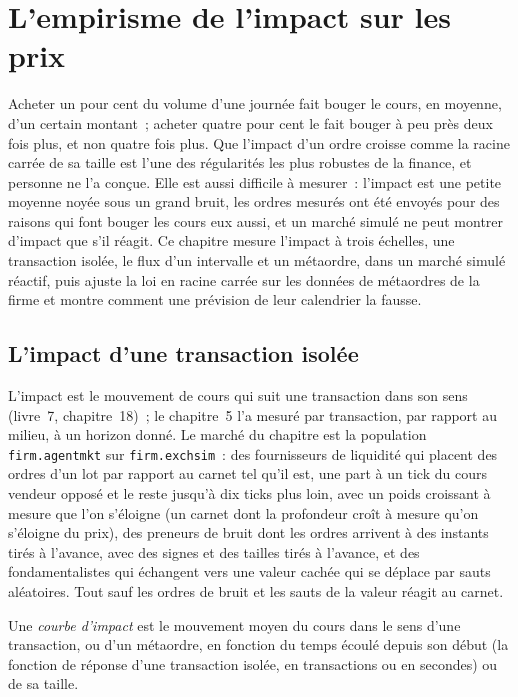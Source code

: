 \chapter{L'empirisme de l'impact sur les prix}\label{ch:mx:the-empirics-of-price-impact}

Acheter un pour cent du volume d'une journée fait bouger le cours, en moyenne, d'un certain montant~; acheter quatre pour cent le fait bouger à peu près deux fois plus, et non quatre fois plus.
Que l'impact d'un ordre croisse comme la racine carrée de sa taille est l'une des régularités les plus robustes de la finance, et personne ne l'a conçue. Elle est aussi
difficile à mesurer~: l'impact est une petite moyenne noyée sous un grand bruit, les ordres mesurés ont été envoyés pour des raisons qui font bouger les cours eux aussi, et un
marché simulé ne peut montrer d'impact que s'il réagit. Ce chapitre mesure l'impact à trois échelles, une transaction isolée, le flux d'un intervalle et un métaordre, dans
un marché simulé réactif, puis ajuste la loi en racine carrée sur les données de métaordres de la firme et montre comment une prévision de leur calendrier la fausse.

\section{L'impact d'une transaction isolée}

L'impact est le mouvement de cours qui suit une transaction dans son sens (livre~7, chapitre~18)~; le chapitre~5 l'a mesuré par transaction, par rapport au milieu, à un
horizon donné. Le marché du chapitre est la population \texttt{firm.agentmkt} sur \texttt{firm.exchsim}~: des fournisseurs de liquidité qui placent des ordres d'un lot par rapport au
carnet tel qu'il est, une part à un tick du cours vendeur opposé et le reste jusqu'à dix ticks plus loin, avec un poids croissant à mesure que l'on s'éloigne (un carnet dont la
profondeur croît à mesure qu'on s'éloigne du prix), des preneurs de bruit dont les ordres arrivent à des instants tirés à l'avance, avec des signes et des tailles tirés à l'avance, et des fondamentalistes qui échangent vers une valeur cachée
qui se déplace par sauts aléatoires. Tout sauf les ordres de bruit et les sauts de la valeur réagit au carnet.

\begin{definition}\label{def:mx:the-empirics-of-price-impact:curve}
Une \emph{courbe d'impact} est le mouvement moyen du cours dans le sens d'une transaction, ou d'un métaordre, en fonction du temps écoulé depuis
son début (la fonction de réponse d'une transaction isolée, en transactions ou en secondes) ou de sa taille.
\end{definition}


